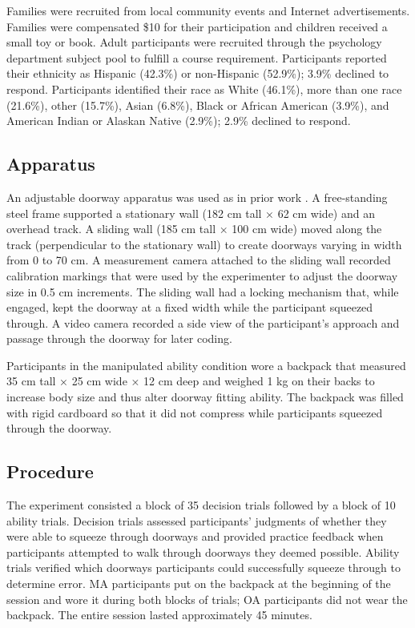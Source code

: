 \documentclass[a4paper,man,natbib,floatsintext,noextraspace]{apa6}
\begin{document}
Families were recruited from local community events and Internet advertisements. Families were compensated \$10 for their participation and children received a small toy or book. Adult participants were recruited through the psychology department subject pool to fulfill a course requirement. Participants reported their ethnicity as Hispanic (42.3\%) or non-Hispanic (52.9\%); 3.9\% declined to respond. Participants identified their race as White (46.1\%), more than one race (21.6\%), other (15.7\%), Asian (6.8\%), Black or African American (3.9\%), and American Indian or Alaskan Native (2.9\%); 2.9\% declined to respond.

\subsection{Apparatus}

An adjustable doorway apparatus was used as in prior work \citep{DoorwayLearning,Recal}. A free-standing steel frame supported a stationary wall (182 cm tall × 62 cm wide) and an overhead track. A sliding wall (185 cm tall × 100 cm wide) moved along the track (perpendicular to the stationary wall) to create doorways varying in width from 0 to 70 cm. A measurement camera attached to the sliding wall recorded calibration markings that were used by the experimenter to adjust the doorway size in 0.5 cm increments. The sliding wall had a locking mechanism that, while engaged, kept the doorway at a fixed width while the participant squeezed through. A video camera recorded a side view of the participant’s approach and passage through the doorway for later coding.

Participants in the manipulated ability condition wore a backpack that measured 35 cm tall × 25 cm wide × 12 cm deep and weighed 1 kg on their backs to increase body size and thus alter doorway fitting ability. The backpack was filled with rigid cardboard so that it did not compress while participants squeezed through the doorway. 

\subsection{Procedure}

The experiment consisted a block of 35 decision trials followed by a block of 10 ability trials. Decision trials assessed participants’ judgments of whether they were able to squeeze through doorways and provided practice feedback when participants attempted to walk through doorways they deemed possible. Ability trials verified which doorways participants could successfully squeeze through to determine error. MA participants put on the backpack at the beginning of the session and wore it during both blocks of trials; OA participants did not wear the backpack. The entire session lasted approximately 45 minutes. 
\end{document}
